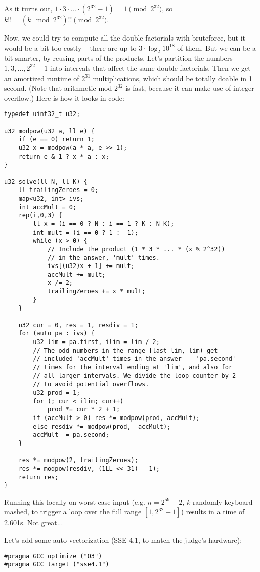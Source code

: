 As it turns out, $1 \cdot 3 \cdot \ldots \cdot (2^{32}-1) = 1 \pmod{2^{32}}$, so $k!! = (k \mod 2^{32})!! \pmod{2^{32}}$.

Now, we could try to compute all the double factorials with bruteforce, but it would be a bit too costly -- there are up to $3 \cdot \log_2{10^{18}}$ of them.
But we can be a bit smarter, by reusing parts of the products.
Let's partition the numbers $1, 3, \dots, 2^{32}-1$ into intervals that affect the same double factorials.
Then we get an amortized runtime of $2^{31}$ multiplications, which should be totally doable in 1 second.
(Note that arithmetic mod $2^{32}$ is fast, because it can make use of integer overflow.)
Here is how it looks in code:

\begin{lstlisting}
typedef uint32_t u32;

u32 modpow(u32 a, ll e) {
	if (e == 0) return 1;
	u32 x = modpow(a * a, e >> 1);
	return e & 1 ? x * a : x;
}

u32 solve(ll N, ll K) {
	ll trailingZeroes = 0;
	map<u32, int> ivs;
	int accMult = 0;
	rep(i,0,3) {
		ll x = (i == 0 ? N : i == 1 ? K : N-K);
		int mult = (i == 0 ? 1 : -1);
		while (x > 0) {
			// Include the product (1 * 3 * ... * (x % 2^32))
			// in the answer, 'mult' times.
			ivs[(u32)x + 1] += mult;
			accMult += mult;
			x /= 2;
			trailingZeroes += x * mult;
		}
	}

	u32 cur = 0, res = 1, resdiv = 1;
	for (auto pa : ivs) {
		u32 lim = pa.first, ilim = lim / 2;
		// The odd numbers in the range [last lim, lim) get
		// included 'accMult' times in the answer -- 'pa.second'
		// times for the interval ending at 'lim', and also for
		// all larger intervals. We divide the loop counter by 2
		// to avoid potential overflows.
		u32 prod = 1;
		for (; cur < ilim; cur++)
			prod *= cur * 2 + 1;
		if (accMult > 0) res *= modpow(prod, accMult);
		else resdiv *= modpow(prod, -accMult);
		accMult -= pa.second;
	}

	res *= modpow(2, trailingZeroes);
	res *= modpow(resdiv, (1LL << 31) - 1);
	return res;
}
\end{lstlisting}

Running this locally on worst-case input (e.g. $n = 2^{59}-2$, $k$ randomly keyboard mashed, to trigger a loop over the full range $[1, 2^{32}-1]$) results in a time of 2.601s. Not great...

Let's add some auto-vectorization (SSE 4.1, to match the judge's hardware):
\begin{lstlisting}
#pragma GCC optimize ("O3")
#pragma GCC target ("sse4.1")
\end{lstlisting}

